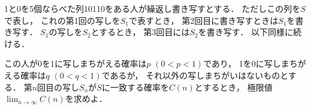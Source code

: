 \documentclass[../../main.tex]{subfiles}
\begin{document}
1と0を5個ならべた列10110をある人が繰返し書き写すとする．
ただしこの列を$S$で表し，
これの第1回の写しを$S_1$で表すとき，
第2回目に書き写すときは$S_1$を書き写す．
$S_1$の写しを$S_2$とするとき，
第3回目には$S_2$を書き写す．
以下同様に続ける．

この人が0を1に写しまちがえる確率は$p$ $(0<p<1)$であり，
1を0に写しまちがえる確率は$q$ $(0<q<1)$であるが，
それ以外の写しまちがいはないものとする．
第$n$回目の写し$S_n$が$S$に一致する確率を$C(n)$とするとき，
極限値$\displaystyle\lim_{n\to\infty}C(n)$を求めよ．
\end{document}
